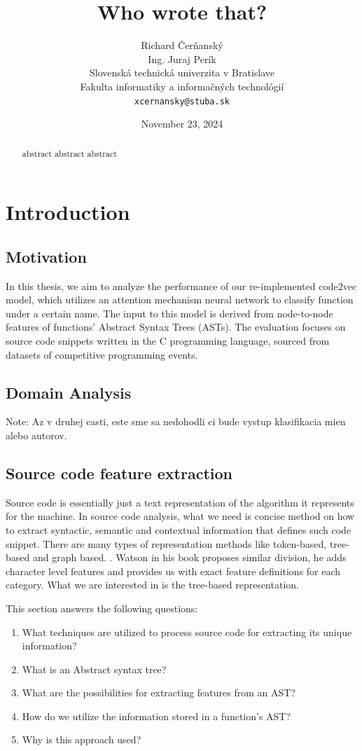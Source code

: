 \documentclass[10pt,english,a4paper]{report}
\title{Who wrote that?}
\author{Richard Čerňanský\\ Ing. Juraj Perík\\
{\small Slovenská technická univerzita v Bratislave}\\
{\small Fakulta informatiky a informačných technológií}\\
{\small \texttt{xcernansky@stuba.sk}}\\
}
\date{\small November 23, 2024}
\begin{document}
\maketitle

\begin{abstract}
abstract abstract abstract

\end{abstract}

\chapter{Introduction}

\section{Motivation}

In this thesis, we aim to analyze the performance of our re-implemented 
code2vec model, which utilizes an attention mechanism neural network to classify function 
under a certain name. 
The input to this model is derived from node-to-node features of 
functions' Abstract Syntax Trees (ASTs). The evaluation focuses on source 
code snippets written in the C programming language, sourced from datasets 
of competitive programming events.

\section{Domain Analysis}
Note: Az v druhej casti, este sme sa nedohodli ci bude vystup klasifikacia mien alebo autorov.

\section{Source code feature extraction}
Source code is essentially just a text representation of the algorithm it
represents for the machine. In source code analysis, what we need is
concise method on how to extract syntactic, semantic and contextual information that defines such code snippet. There are many types of representation methods like token-based, tree-based and graph based.
\cite{samoaa}. Watson in his book \cite{DanielWatson} proposes similar division, he adds character level features and provides us with exact feature definitions for each category.  What we are interested in is the tree-based representation.

This section answers the following questions:

\begin{enumerate}
    \item What techniques are utilized to process source code for extracting its unique information?
    \item What is an Abstract syntax tree?
    \item What are the possibilities for extracting features from an AST?
    \item How do we utilize the information stored in a function's AST?
    \item Why is this approach used?
\end{enumerate}
\end{document}
